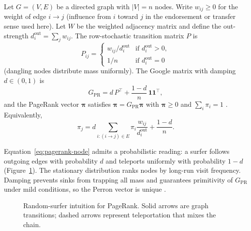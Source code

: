 
Let $G=(V,E)$ be a directed graph with $|V|=n$ nodes. Write $w_{ij}\geq 0$ for the weight of edge $i\to j$ (influence from $i$ toward $j$ in the endorsement or transfer sense used here). Let $W$ be the weighted adjacency matrix and define the out-strength $d_i^{\mathrm{out}}=\sum_j w_{ij}$. The row-stochastic transition matrix $P$ is
\begin{equation}
P_{ij} =
\begin{cases}
w_{ij}/d_i^{\mathrm{out}} & \text{if } d_i^{\mathrm{out}}>0,\\
1/n & \text{if } d_i^{\mathrm{out}}=0
\end{cases}
\label{eq:transition}
\end{equation}
(dangling nodes distribute mass uniformly). The Google matrix with damping $d\in(0,1)$ is
\begin{equation}
G_{\mathrm{PR}} = d\, P^{\top} + \frac{1-d}{n}\,\mathbf{1}\mathbf{1}^{\top},
\label{eq:google-matrix}
\end{equation}
and the PageRank vector $\boldsymbol{\pi}$ satisfies $\boldsymbol{\pi}=G_{\mathrm{PR}}\boldsymbol{\pi}$ with $\boldsymbol{\pi}\geq 0$ and $\sum_i \pi_i=1$ . Equivalently,
\begin{equation}
\pi_j = d\sum_{i:(i\to j)\in E}\pi_i \frac{w_{ij}}{d_i^{\mathrm{out}}} + \frac{1-d}{n}.
\label{eq:pagerank-node}
\end{equation}


Equation~\eqref{eq:pagerank-node} admits a probabilistic reading: a surfer follows outgoing edges with probability $d$ and teleports uniformly with probability $1-d$ (Figure~\ref{fig:random-surfer}). The stationary distribution ranks nodes by long-run visit frequency. Damping prevents sinks from trapping all mass and guarantees primitivity of $G_{\mathrm{PR}}$ under mild conditions, so the Perron vector is unique .

\begin{figure}[htbp]
\centering
{}
\caption{Random-surfer intuition for PageRank. Solid arrows are graph transitions; dashed arrows represent teleportation that mixes the chain.}
\label{fig:random-surfer}
\end{figure}

